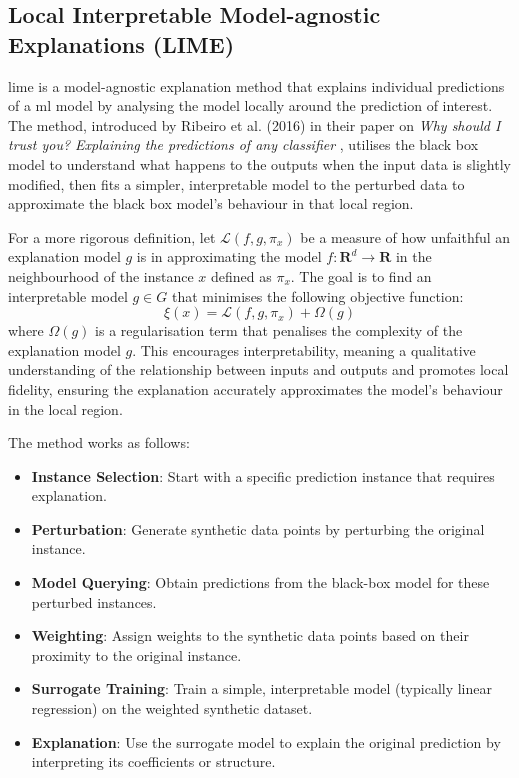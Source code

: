 \subsection{Local Interpretable Model-agnostic Explanations (LIME)} \label{sec:lime}

\acrfull{lime} is a model-agnostic explanation method that explains individual predictions of a \acrlong{ml} model by analysing the model locally around the prediction of interest. The method, introduced by Ribeiro et al. (2016) in their paper on \textit{Why should I trust you? Explaining the predictions of any classifier} \cite{Ribeiro2016}, utilises the black box model to understand what happens to the outputs when the input data is slightly modified, then fits a simpler, interpretable model to the perturbed data to approximate the black box model's behaviour in that local region.

For a more rigorous definition, let $\mathcal{L}(f,g,\pi_x)$ be a measure of how unfaithful an explanation model $g$ is in approximating the model $f:\mathbf{R}^d \to \mathbf{R}$ in the neighbourhood of the instance $x$ defined as $\pi_x$. The goal is to find an interpretable model $g \in G$ that minimises the following objective function:
\begin{equation}
    \xi(x) = \mathcal{L}(f, g, \pi_x) + \Omega(g)
\end{equation}
where $\Omega(g)$ is a regularisation term that penalises the complexity of the explanation model $g$. This encourages interpretability, meaning a qualitative understanding of the relationship between inputs and outputs and promotes local fidelity, ensuring the explanation accurately approximates the model's behaviour in the local region. 

The method works as follows:
\begin{itemize}
    \item \textbf{Instance Selection}: Start with a specific prediction instance that requires explanation.
    \item \textbf{Perturbation}: Generate synthetic data points by perturbing the original instance.
    \item \textbf{Model Querying}: Obtain predictions from the black-box model for these perturbed instances.
    \item \textbf{Weighting}: Assign weights to the synthetic data points based on their proximity to the original instance.
    \item \textbf{Surrogate Training}: Train a simple, interpretable model (typically linear regression) on the weighted synthetic dataset.
    \item \textbf{Explanation}: Use the surrogate model to explain the original prediction by interpreting its coefficients or structure.
\end{itemize}

